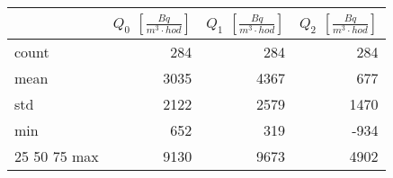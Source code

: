 \begin{tabular}{lrrr}
\toprule
{} &  $Q_0$ $\left[\si{\frac{Bq}{m^3\cdot hod}}\right]$ &  $Q_1$ $\left[\si{\frac{Bq}{m^3\cdot hod}}\right]$ &  $Q_2$ $\left[\si{\frac{Bq}{m^3\cdot hod}}\right]$ \\
\midrule
count &                                                284 &                                                284 &                                                284 \\
mean  &  3035 &      4367 &     677 \\
std   &  2122 &      2579 &    1470 \\
min   &                                                652 &                                                319 &                                               -934 \\
25%
50%
75%
max   &                                               9130 &                                               9673 &                                               4902 \\
\bottomrule
\end{tabular}
